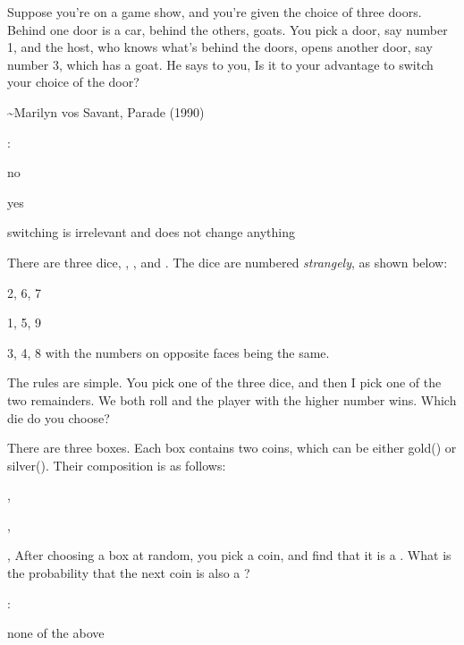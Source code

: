 \startchapter [title={Exercises}]
	
	\startsection [title={2019-06-19}]
		
		\startexercise [title={Monty Hall}]
			Suppose you’re on a game show, and you’re given the choice of three doors. Behind one door is a car, behind the others, goats. You pick a door, say number 1, and the host, who knows what’s behind the doors, opens another door, say number 3, which has a goat. He says to you,  Is it to your advantage to switch your choice of the door? 

			\qquad  \textasciitilde Marilyn vos Savant, Parade (1990)

			:
			\startitemize [n, joinedup]
				\item  no
				\item  yes
				\item  switching is irrelevant and does not change anything
			\stopitemize
		\stopexercise

		\startexercise [title={strange dice}]
			There are three dice, , , and . The dice are numbered \emph{strangely}, as shown below:
			\startitemize [A, joinedup]
				\item  2, 6, 7
				\item  1, 5, 9
				\item  3, 4, 8
			\stopitemize
			with the numbers on opposite faces being the same.

			The rules are simple. You pick one of the three dice, and then I pick one of the two remainders. We both roll and the player with the higher number wins. Which die do you choose?
		\stopexercise

		\startexercise [title={Bertrand's box}]
			There are three boxes. Each box contains two coins, which can be either gold() or silver(). Their composition is as follows:
			\startitemize [A, joinedup]
				\item  {}, 
				\item  {}, 
				\item  {}, 
			\stopitemize
			After choosing a box at random, you pick a coin, and find that it is a . What is the probability that the next coin is also a ?
			
			:
			\startitemize [n, joinedup]
				\item  {}
				\item  {}
				\item  {}
				\item  none of the above
			\stopitemize
		\stopexercise

